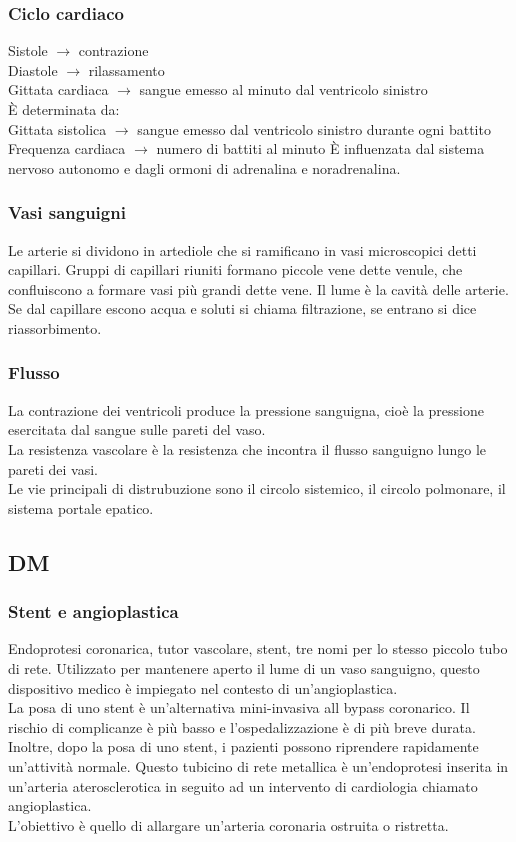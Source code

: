 \documentclass[a4paper]{article}
\begin{document}
\subsubsection{Ciclo cardiaco}
Sistole $\to$ contrazione \\ Diastole $\to$ rilassamento \\
Gittata cardiaca $\to$ sangue emesso al minuto dal ventricolo sinistro \\
È determinata da: \\
Gittata sistolica $\to$ sangue emesso dal ventricolo sinistro durante ogni 
battito \\
Frequenza cardiaca $\to$ numero di battiti al minuto
È influenzata dal sistema nervoso autonomo e dagli ormoni di adrenalina e
noradrenalina. \\

\subsubsection{Vasi sanguigni}
Le arterie si dividono in artediole che si ramificano in vasi microscopici
detti capillari. Gruppi di capillari riuniti formano piccole vene dette 
venule, che confluiscono a formare vasi più grandi dette vene. Il lume è la
cavità delle arterie. Se dal capillare escono acqua e soluti si chiama 
filtrazione, se entrano si dice riassorbimento.

\subsubsection{Flusso}
La contrazione dei ventricoli produce la pressione sanguigna, cioè la 
pressione esercitata dal sangue sulle pareti del vaso. \\
La resistenza vascolare è la resistenza che incontra il flusso sanguigno 
lungo le pareti dei vasi. \\
Le vie principali di distrubuzione sono il circolo sistemico, il circolo 
polmonare, il sistema portale epatico.

\subsection{DM}
\subsubsection{Stent e angioplastica}
Endoprotesi coronarica, tutor vascolare, stent, tre nomi per lo stesso 
piccolo tubo di rete. Utilizzato per mantenere aperto il lume di un vaso 
sanguigno, questo dispositivo medico è impiegato nel contesto di 
un'angioplastica. \\
La posa di uno stent è un'alternativa mini-invasiva all bypass coronarico. 
Il rischio di complicanze è più basso e l’ospedalizzazione è di più breve 
durata. Inoltre, dopo la posa di uno stent, i pazienti possono riprendere 
rapidamente un'attività normale. Questo tubicino di rete metallica è 
un’endoprotesi inserita in un'arteria aterosclerotica in seguito ad un
intervento di cardiologia chiamato angioplastica. \\
L'obiettivo è quello di allargare un'arteria coronaria ostruita
o ristretta.
\end{document}
